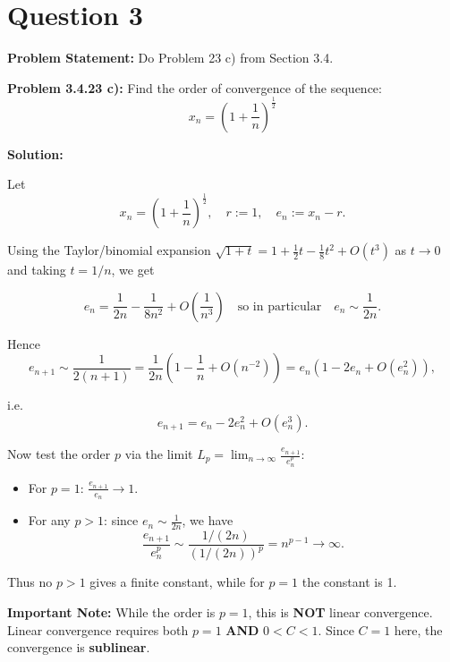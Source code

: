\clearpage
\section*{Question 3}

\textbf{Problem Statement:} Do Problem 23 c) from Section 3.4.

\textbf{Problem 3.4.23 c):} Find the order of convergence of the sequence:
$$x_n = \left(1 + \frac{1}{n}\right)^{\frac{1}{2}}$$

\vspace{1em}

\textbf{Solution:}

Let 
$$x_n = \left(1 + \frac{1}{n}\right)^{\frac{1}{2}}, \quad r := 1, \quad e_n := x_n - r.$$

Using the Taylor/binomial expansion $\sqrt{1 + t} = 1 + \frac{1}{2}t - \frac{1}{8}t^2 + O(t^3)$ as $t \to 0$ and taking $t = 1/n$, we get

$$e_n = \frac{1}{2n} - \frac{1}{8n^2} + O\left(\frac{1}{n^3}\right) \quad \text{so in particular} \quad e_n \sim \frac{1}{2n}.$$

Hence
$$e_{n+1} \sim \frac{1}{2(n+1)} = \frac{1}{2n}\left(1 - \frac{1}{n} + O(n^{-2})\right) = e_n\left(1 - 2e_n + O(e_n^2)\right),$$

i.e.
$$e_{n+1} = e_n - 2e_n^2 + O(e_n^3).$$

Now test the order $p$ via the limit $L_p = \lim_{n \to \infty} \frac{e_{n+1}}{e_n^p}$:

\begin{itemize}
\item For $p = 1$: $\frac{e_{n+1}}{e_n} \to 1$.

\item For any $p > 1$: since $e_n \sim \frac{1}{2n}$, we have 
$$\frac{e_{n+1}}{e_n^p} \sim \frac{1/(2n)}{(1/(2n))^p} = n^{p-1} \to \infty.$$
\end{itemize}

Thus no $p > 1$ gives a finite constant, while for $p = 1$ the constant is 1.

\begin{center}
\end{center}

\textbf{Important Note:} While the order is $p = 1$, this is \textbf{NOT} linear convergence. Linear convergence requires both $p = 1$ \textbf{AND} $0 < C < 1$. Since $C = 1$ here, the convergence is \textbf{sublinear}. 

